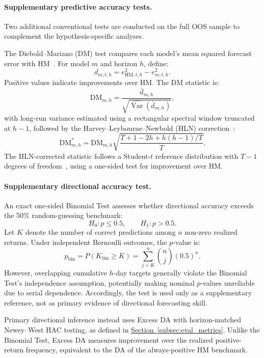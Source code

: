 \documentclass[runningheads,orivec]{llncs}
\begin{document}
\paragraph{Supplementary predictive accuracy tests.} Two additional conventional tests are conducted on the full OOS sample to complement the hypothesis-specific analyses.

The Diebold--Mariano (DM) test compares each model's mean squared forecast error with HM~\cite{diebold1995}. For model $m$ and horizon $h$, define:
\[
d_{m,t,h}
=
e^2_{\mathrm{HM},t,h}-e^2_{m,t,h}.
\]
Positive values indicate improvements over HM. The DM statistic is:
\[
\mathrm{DM}_{m,h}
=
\frac{\bar d_{m,h}}
{\sqrt{\widehat{\operatorname{Var}}(\bar d_{m,h})}},
\]
with long-run variance estimated using a rectangular spectral window truncated at $h-1$, followed by the Harvey--Leybourne--Newbold (HLN) correction~\cite{buturac2022,diebold1995,harvey1997}:
\begin{equation}\label{eq:dm_stat}
\mathrm{DM}^{*}_{m,h}
=
\mathrm{DM}_{m,h}
\sqrt{
\frac{T+1-2h+h(h-1)/T}{T}
}.
\end{equation}
The HLN-corrected statistic follows a Student-$t$ reference distribution with $T-1$ degrees of freedom~\cite{buturac2022,harvey1997}, using a one-sided test for improvement over HM.

\paragraph{Supplementary directional accuracy test.} An exact one-sided Binomial Test assesses whether directional accuracy exceeds the 50\% random-guessing benchmark:
\[
H_0:p\leq 0.5,
\qquad
H_1:p>0.5.
\]
Let $K$ denote the number of correct predictions among $n$ non-zero realized returns. Under independent Bernoulli outcomes, the $p$-value is:
\[
p_{\mathrm{bin}}
=
P(K_{\mathrm{bin}}\geq K)
=
\sum_{j=K}^{n}
\binom{n}{j}(0.5)^n.
\]
However, overlapping cumulative $h$-day targets generally violate the Binomial Test's independence assumption, potentially making nominal $p$-values unreliable due to serial dependence. Accordingly, the test is used only as a supplementary reference, not as primary evidence of directional forecasting skill.

Primary directional inference instead uses Excess DA with horizon-matched Newey--West HAC testing, as defined in \hyperref[subsec:eval_metrics]{Section~\ref*{subsec:eval_metrics}}. Unlike the Binomial Test, Excess DA measures improvement over the realized positive-return frequency, equivalent to the DA of the always-positive HM benchmark.
\end{document}
